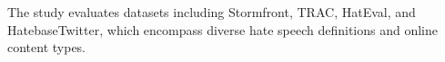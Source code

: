 The study evaluates datasets including Stormfront, TRAC, HatEval, and HatebaseTwitter, which encompass diverse hate speech definitions and online content types.